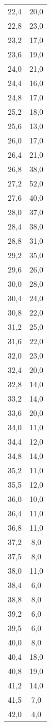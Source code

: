 \begin{longtable}{cc}
22,4	&20,0\\
22,8	&23,0\\
23,2	&17,0\\
23,6	&19,0\\
24,0	&21,0\\
24,4	&16,0\\
24,8	&17,0\\
25,2	&18,0\\
25,6	&13,0\\
26,0	&17,0\\
26,4	&21,0\\
26,8	&38,0\\
27,2	&52,0\\
27,6	&40,0\\
28,0	&37,0\\
28,4	&38,0\\
28,8	&31,0\\
29,2	&35,0\\
29,6	&26,0\\
30,0	&28,0\\
30,4	&24,0\\
30,8	&22,0\\
31,2	&25,0\\
31,6	&22,0\\
32,0	&23,0\\
32,4	&20,0\\
32,8	&14,0\\
33,2	&14,0\\
33,6	&20,0\\
34,0	&11,0\\
34,4	&12,0\\
34,8	&14,0\\
35,2	&11,0\\
35,5	&12,0\\
36,0	&10,0\\
36,4	&11,0\\
36,8	&11,0\\
37,2	&8,0 \\
37,5	&8,0\\
38,0	&11,0\\
38,4&	6,0\\
38,8&	8,0\\
39,2&	6,0\\
39,5&	6,0\\
40,0&	8,0\\
40,4	&18,0\\
40,8	&19,0\\
41,2	&14,0\\
41,5	&7,0\\
42,0	&4,0\\

\end{longtable}
